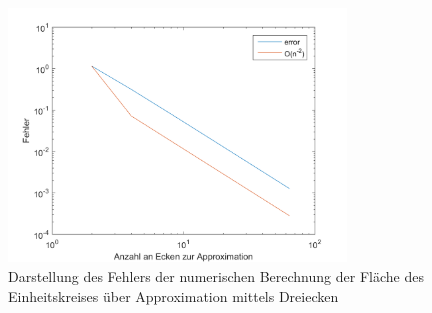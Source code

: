 \documentclass[a4paper,11pt,bibliography=totoc,listof=totoc,headinclude=true,cleardoublepage=empty,oneside]{scrbook}
\begin{document}
\begin{figure}[h]
	\centering
	\includegraphics[width=0.8\textwidth]{plot_3_5_4.png}
	\caption{Darstellung des Fehlers der numerischen Berechnung der Fläche des Einheitskreises über Approximation mittels Dreiecken}
	\label{fig:3_5_4}
\end{figure}



					
				
				
		
		
	
			
	
	
		
	
			
	
	
\end{document}

